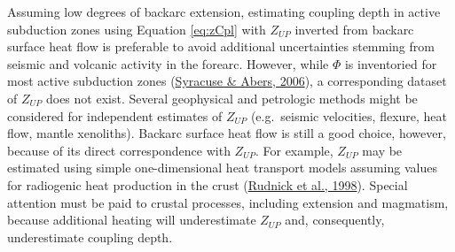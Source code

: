 Assuming low degrees of backarc extension, estimating coupling depth in active subduction zones using Equation \eqref{eq:zCpl} with \(Z_{UP}\) inverted from backarc surface heat flow is preferable to avoid additional uncertainties stemming from seismic and volcanic activity in the forearc. However, while \(\Phi\) is inventoried for most active subduction zones (\protect\hyperlink{ref-syracuse2006}{Syracuse \& Abers, 2006}), a corresponding dataset of \(Z_{UP}\) does not exist. Several geophysical and petrologic methods might be considered for independent estimates of \(Z_{UP}\) (e.g.~seismic velocities, flexure, heat flow, mantle xenoliths). Backarc surface heat flow is still a good choice, however, because of its direct correspondence with \(Z_{UP}\). For example, \(Z_{UP}\) may be estimated using simple one-dimensional heat transport models assuming values for radiogenic heat production in the crust (\protect\hyperlink{ref-rudnick1998}{Rudnick et al., 1998}). Special attention must be paid to crustal processes, including extension and magmatism, because additional heating will underestimate \(Z_{UP}\) and, consequently, underestimate coupling depth.

